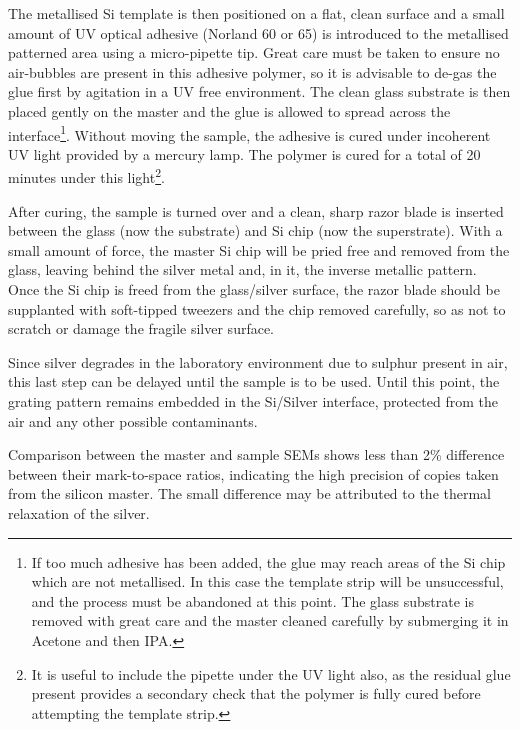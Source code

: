 The metallised Si template is then positioned on a flat, clean surface and a small amount of UV optical adhesive (Norland 60 or 65) is introduced to the metallised patterned area using a micro-pipette tip. Great care must be taken to ensure no air-bubbles are present in this adhesive polymer, so it is advisable to de-gas the glue first by agitation in a UV free environment.  The clean glass substrate is then placed gently on the master and the glue is allowed to spread across the interface\footnote{If too much adhesive has been added, the glue may reach areas of the Si chip which are not metallised. In this case the template strip will be unsuccessful, and the process must be abandoned at this point. The glass substrate is removed with great care and the master cleaned carefully by submerging it in Acetone and then IPA.}.
Without moving the sample, the adhesive is cured under incoherent UV light provided by a mercury lamp. The polymer is cured for a total of 20 minutes under this light\footnote{It is useful to include the pipette under the UV light also, as the residual glue present provides a secondary check that the polymer is fully cured before attempting the template strip.}.

After curing, the sample is turned over and a clean, sharp razor blade is inserted between the glass (now the substrate) and Si chip (now the superstrate). With a small amount of force, the master Si chip will be pried free and removed from the glass, leaving behind the silver metal and, in it, the inverse metallic pattern. Once the Si chip is freed from the glass/silver surface, the razor blade should be supplanted with soft-tipped tweezers and the chip removed carefully, so as not to scratch or damage the fragile silver surface.

Since silver degrades in the laboratory environment due to sulphur present in air, this last step can be delayed until the sample is to be used. Until this point, the grating pattern remains embedded in the Si/Silver interface, protected from the air and any other possible contaminants.

Comparison between the master and sample SEMs shows less than 2\% difference between their mark-to-space ratios, indicating the high precision of copies taken from the silicon master. The small difference may be attributed to the thermal relaxation of the silver.
   
